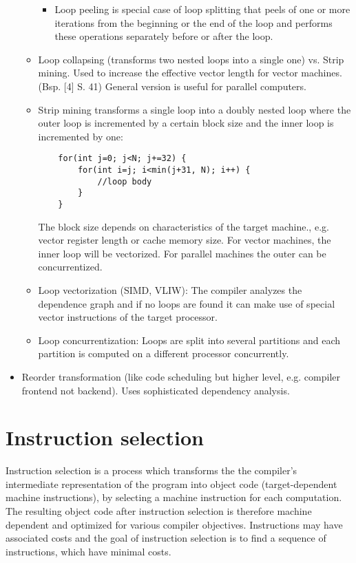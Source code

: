 \documentclass[a4paper,10pt]{article}
\begin{document}
\begin{itemize}
\begin{itemize}
\begin{itemize}
     	\item Loop peeling is special case of loop splitting that peels of one or more iterations from the beginning or the end of the loop and performs these operations separately before or after the loop.
     \end{itemize}
     \item Loop collapsing (transforms two nested loops into a single one) vs. Strip mining. Used to increase the effective vector length for vector machines. (Bsp. [4] S. 41) General version is useful for parallel computers.
     \item Strip mining transforms a single loop into a doubly nested loop where the outer loop is incremented by a certain block size
     and the inner loop is incremented by one:
     \begin{lstlisting}
	for(int j=0; j<N; j+=32) {
	    for(int i=j; i<min(j+31, N); i++) {
	        //loop body
	    }
	}
     \end{lstlisting}
     The block size depends on characteristics of the target machine., e.g. vector register length or cache memory size. For vector machines, the inner loop will be vectorized. For parallel machines the outer can be concurrentized.
     \item Loop vectorization (SIMD, VLIW): The compiler analyzes the dependence graph and if no loops are found it can make use of
           special vector instructions of the target processor.
     \item Loop concurrentization: Loops are split into several partitions and each partition is computed on a different processor
           concurrently.
 \end{itemize}
 \item Reorder transformation (like code scheduling but higher level, e.g. compiler frontend not backend). Uses sophisticated dependency
       analysis.
\end{itemize}

\section{Instruction selection}
Instruction selection is a process which transforms the the compiler's intermediate representation of the program into object code (target-dependent machine instructions), by selecting a machine instruction for each computation. The resulting object code after instruction selection is therefore machine dependent and optimized for various compiler objectives. Instructions may have associated costs and the goal of instruction selection is to find a sequence of instructions, which have minimal costs.
\end{document}
